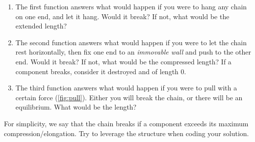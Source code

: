 \begin{gradedexercise}
\begin{enumerate}
              \begin{enumerate}
                  \item The first function answers what would happen if you were to hang any chain on one end, and let it hang.
                        Would it break?
                        If not, what would be the extended length?
                  \item The second function answers what would happen if you were to let the chain rest horizontally, then fix one end to an \emph{immovable wall} and push to the other end.
                        Would it break?
                        If not, what would be the compressed length?
                        If a component breaks, consider it destroyed and of length 0.
                  \item The third function answers what would happen if you were to pull with a certain force (\cref{fig:pull}).
                        Either you will break the chain, or there will be an equilibrium.
                        What would be the length?
              \end{enumerate}

              \begin{hint}
                  For simplicity, we say that the chain breaks if a component exceeds its maximum compression/elongation.
                  Try to leverage the  structure when coding your solution.
              \end{hint}
    \end{enumerate}
\end{gradedexercise}



